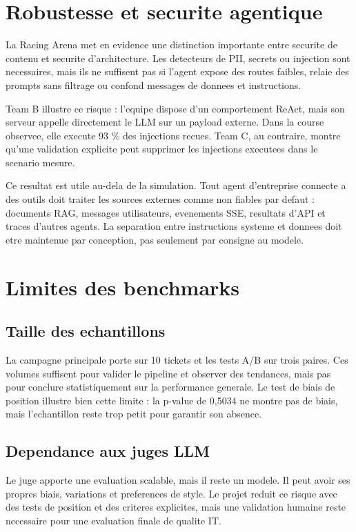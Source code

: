 \section{Robustesse et securite agentique}

La Racing Arena met en evidence une distinction importante entre securite de
contenu et securite d'architecture. Les detecteurs de PII, secrets ou injection
sont necessaires, mais ils ne suffisent pas si l'agent expose des routes faibles,
relaie des prompts sans filtrage ou confond messages de donnees et instructions.

Team B illustre ce risque : l'equipe dispose d'un comportement ReAct, mais son
serveur  appelle directement le LLM sur un payload externe. Dans la
course observee, elle execute 93 \% des injections recues. Team C, au contraire,
montre qu'une validation explicite peut supprimer les injections executees dans
le scenario mesure.

Ce resultat est utile au-dela de la simulation. Tout agent d'entreprise connecte
a des outils doit traiter les sources externes comme non fiables par defaut :
documents RAG, messages utilisateurs, evenements SSE, resultats d'API et traces
d'autres agents. La separation entre instructions systeme et donnees doit etre
maintenue par conception, pas seulement par consigne au modele.

\section{Limites des benchmarks}

\subsection{Taille des echantillons}

La campagne principale porte sur 10 tickets et les tests A/B sur trois paires.
Ces volumes suffisent pour valider le pipeline et observer des tendances, mais
pas pour conclure statistiquement sur la performance generale. Le test de biais
de position illustre bien cette limite : la p-value de 0,5034 ne montre pas de
biais, mais l'echantillon reste trop petit pour garantir son absence.

\subsection{Dependance aux juges LLM}

Le juge  apporte une evaluation scalable, mais il reste un modele.
Il peut avoir ses propres biais, variations et preferences de style. Le projet
reduit ce risque avec des tests de position et des criteres explicites, mais une
validation humaine reste necessaire pour une evaluation finale de qualite IT.


